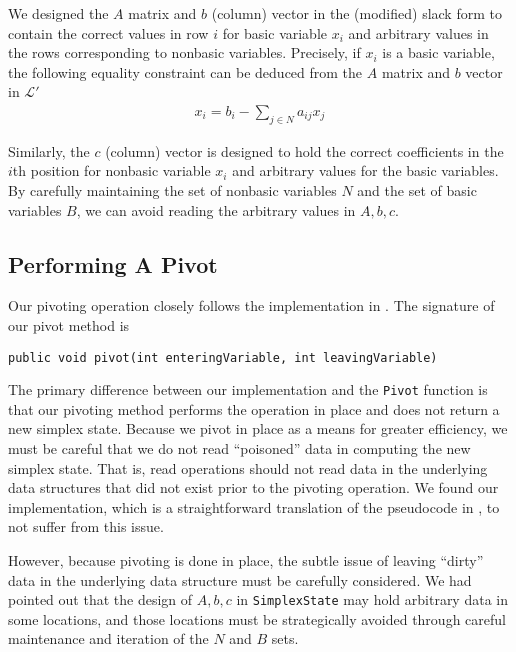 \documentclass{article}
\newcommand{\javaCode}[1]{\texttt{#1}}
\begin{document}
We designed the $A$ matrix and $b$ (column) vector in the (modified) slack form to contain the correct values in row $i$ for basic variable $x_i$ and arbitrary values in the rows corresponding to nonbasic variables. Precisely, if $x_i$ is a basic variable, the following equality constraint can be deduced from the $A$ matrix and $b$ vector in $\mathcal{L}'$
\begin{align*}
    x_i = b_i - \sum_{j \in N}a_{ij}x_j
\end{align*}

Similarly, the $c$ (column) vector is designed to hold the correct coefficients in the $i$th position for nonbasic variable $x_i$ and arbitrary values for the basic variables. By carefully maintaining the set of nonbasic variables $N$ and the set of basic variables $B$, we can avoid reading the arbitrary values in $A,b , c$.

\subsection{Performing A Pivot}
Our pivoting operation closely follows the implementation in \cite{CLRS}. The signature of our pivot method is
\begin{verbatim}
public void pivot(int enteringVariable, int leavingVariable)
\end{verbatim}
The primary difference between our implementation and the \javaCode{Pivot} function \cite{CLRS} is that our pivoting method performs the operation in place and does not return a new simplex state. Because we pivot in place as a means for greater efficiency, we must be careful that we do not read ``poisoned'' data in computing the new simplex state. That is, read operations should not read data in the underlying data structures that did not exist prior to the pivoting operation. We found our implementation, which is a straightforward translation of the pseudocode in \cite{CLRS}, to not suffer from this issue. 

However, because pivoting is done in place, the subtle issue of leaving ``dirty'' data in the underlying data structure must be carefully considered. We had pointed out that the design of $A, b, c$ in \javaCode{SimplexState} may hold arbitrary data in some locations, and those locations must be strategically avoided through careful maintenance and iteration of the $N$ and $B$ sets.
    
\end{document}
